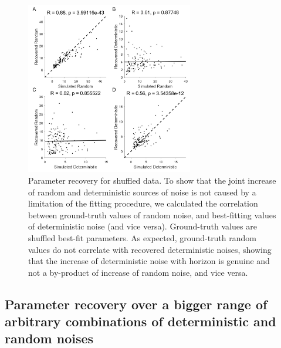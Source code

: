 \documentclass[12pt]{article}
\begin{document}
	\begin{figure}[hp]
		\begin{center}
			\includegraphics[width=0.65\textwidth]{figures/R1_shuffle_shuffled_recovery.jpg}
			\caption{Parameter recovery for shuffled data. To show that the joint increase of random and deterministic sources of noise is not caused by a limitation of the fitting procedure, we calculated the correlation between ground-truth values of random noise, and best-fitting values of deterministic noise (and vice versa). Ground-truth values are shuffled best-fit parameters. As expected, ground-truth random values do not correlate with recovered deterministic noises, showing that the increase of deterministic noise with horizon is genuine and not a by-product of increase of random noise, and vice versa.  }
			\label{fig:paramrecover_sub}
		\end{center}
	\end{figure} 
	
	\newpage	
	\subsection{Parameter recovery over a bigger range of arbitrary combinations of deterministic and random noises \label{gridrecovery}}
	
	
\end{document}

